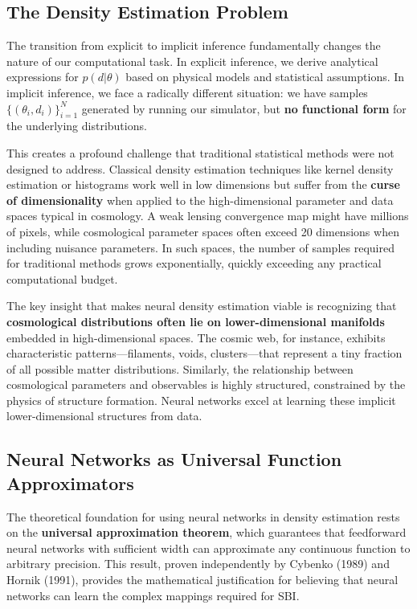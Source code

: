 \documentclass{SciPost}
\begin{document}
\subsection{The Density Estimation Problem}

The transition from explicit to implicit inference fundamentally changes the nature of our computational task. In explicit inference, we derive analytical expressions for $p(d|\theta)$ based on physical models and statistical assumptions. In implicit inference, we face a radically different situation: we have samples $\{(\theta_i, d_i)\}_{i=1}^N$ generated by running our simulator, but \textbf{no functional form} for the underlying distributions.

This creates a profound challenge that traditional statistical methods were not designed to address. Classical density estimation techniques like kernel density estimation or histograms work well in low dimensions but suffer from the \textbf{curse of dimensionality} when applied to the high-dimensional parameter and data spaces typical in cosmology. A weak lensing convergence map might have millions of pixels, while cosmological parameter spaces often exceed 20 dimensions when including nuisance parameters. In such spaces, the number of samples required for traditional methods grows exponentially, quickly exceeding any practical computational budget.

The key insight that makes neural density estimation viable is recognizing that \textbf{cosmological distributions often lie on lower-dimensional manifolds} embedded in high-dimensional spaces. The cosmic web, for instance, exhibits characteristic patterns—filaments, voids, clusters—that represent a tiny fraction of all possible matter distributions. Similarly, the relationship between cosmological parameters and observables is highly structured, constrained by the physics of structure formation. Neural networks excel at learning these implicit lower-dimensional structures from data.

\subsection{Neural Networks as Universal Function Approximators}

The theoretical foundation for using neural networks in density estimation rests on the \textbf{universal approximation theorem}, which guarantees that feedforward neural networks with sufficient width can approximate any continuous function to arbitrary precision. This result, proven independently by Cybenko (1989) and Hornik (1991), provides the mathematical justification for believing that neural networks can learn the complex mappings required for SBI.
\end{document}
